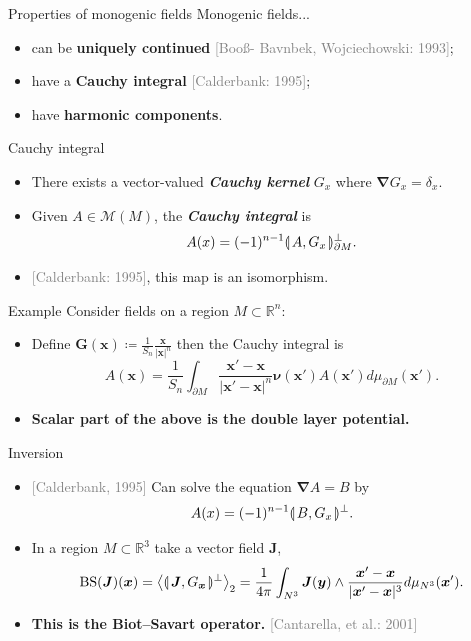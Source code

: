 \documentclass[aspectratio=169,handout]{beamer}
\newcommand\boldgreen[1]{\textcolor{lighter_csu_green}{\emph{\textbf{#1}}}}
\newcommand\boldgold[1]{\textcolor{csu_gold}{\textbf{#1}}}
\newcommand\grey[1]{\textcolor{gray}{#1}}
\newcommand{\directedintproduct}[2]{\llparenthesis \hspace*{.5mm}#1 , #2\hspace*{.5mm} \rrparenthesis}
\newcommand{\R}{\mathbb{R}}
\newcommand{\grad}{\boldsymbol{\nabla}}
\newcommand{\monogenics}{\mathcal{M}}
\newcommand{\blade}[1]{\boldsymbol{#1}}
\newcommand{\boundary}{{\partial M}}
\newcommand{\normal}{\blade{\nu}}
\DeclarePairedDelimiter\angles{\langle}{\rangle}
\newcommand{\proj}[2]{\angles*{#2}_{#1}}
\begin{document}
\begin{frame}{Properties of monogenic fields}
\vfill
Monogenic fields...
\begin{itemize}
  \pause
  \item can be \boldgold{uniquely continued} \grey{[Boo\ss - Bavnbek, Wojciechowski: 1993]};
  \pause
  \item have a \boldgold{Cauchy integral} \grey{[Calderbank: 1995]};
  \pause
  \item have \boldgold{harmonic components}.
\end{itemize}
\vfill
\end{frame}

\begin{frame}{Cauchy integral}
\vfill
\begin{itemize}
\pause
\item There exists a vector-valued \boldgreen{Cauchy kernel} $G_x$ where $\grad G_x = \delta_x$.
\pause
\item Given $A\in \monogenics(M)$, the \boldgreen{Cauchy integral} is
\[
A(x)=(-1)^{n-1}\directedintproduct{A}{G_x}_{\boundary}^\perp.
\]
\pause
\item \grey{[Calderbank: 1995]}, this map is an isomorphism.
\end{itemize}
\vfill
\end{frame}

\begin{frame}{Example}
\vfill
Consider fields on a region $M\subset \R^n$:
\begin{itemize}
\pause
\item Define $\blade{G}(\blade{x}) \coloneqq \frac{1}{S_n}\frac{\blade{x}}{|\blade{x}|^n}$ then the Cauchy integral is
\[
A(\blade{x}) = \frac{1}{S_n} \int_\boundary \frac{\blade{x}' - \blade{x}}{|\blade{x}' - \blade{x}|^n}\normal(\blade{x}') A(\blade{x}') d \mu_{\boundary}(\blade{x}').
\]
\pause
\item \boldgold{Scalar part of the above is the double layer potential.}
\end{itemize}
\vfill
\end{frame}

\begin{frame}{Inversion}
\vfill
\begin{itemize}
  \pause
  \item \grey{[Calderbank, 1995]} Can solve the equation $\grad A=B$ by
\[
A(x) = (-1)^{n-1}\directedintproduct{B}{G_x}^\perp.
\]
  \pause
  \item In a region $M\subset \R^3$ take a vector field $\blade{J}$,
  \[
  \operatorname{BS}(\blade{J})(\blade{x}) = \proj{2}{\directedintproduct{\blade{J}}{G_{\blade{x}}}^\perp} = \frac{1}{4\pi} \int_{N^3} \blade{J}(\blade{y}) \wedge \frac{\blade{x}'-\blade{x}}{|\blade{x}'-\blade{x}|^{3}} d\mu_{N^3}(\blade{x}').
  \]
  \pause
  \item \boldgold{This is the Biot--Savart operator.} \grey{[Cantarella, et al.: 2001]}
  \end{itemize}
\vfill
\end{frame}
\end{document}

